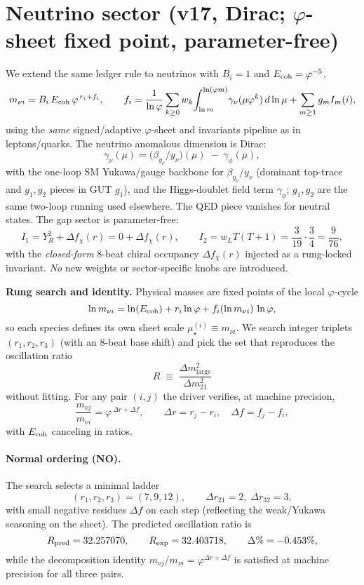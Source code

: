 \documentclass[12pt]{article}
\begin{document}
\section*{Neutrino sector (v17, Dirac; $\varphi$-sheet fixed point, parameter-free)}
We extend the same ledger rule to neutrinos with $B_i=1$ and $E_{\rm coh}=\varphi^{-5}$,
\[
m_{\nu i}=B_i\,E_{\rm coh}\,\varphi^{\,r_i+f_i},\qquad f_i=\frac{1}{\ln\varphi}\sum_{k\ge0}w_k\!\int_{\ln m}^{\ln(\varphi m)}\!\gamma_{\nu}(\mu\varphi^k)\,d\ln\mu+\sum_{m\ge1}g_m I_m(i),
\]
using the \emph{same} signed/adaptive $\varphi$-sheet and invariants pipeline as in leptons/quarks. The neutrino anomalous dimension is Dirac:
\[
\gamma_\nu(\mu)=\bigl(\beta_{y_\nu}/y_\nu\bigr)(\mu)\;-\;\gamma_\phi(\mu),
\]
with the one-loop SM Yukawa/gauge backbone for $\beta_{y_\nu}/y_\nu$ (dominant top-trace and $g_1,g_2$ pieces in GUT $g_1$), and the Higgs-doublet field term $\gamma_\phi$; $g_1,g_2$ are the same two-loop running used elsewhere. The QED piece vanishes for neutral states. The gap sector is parameter-free:
\[
I_1=Y_R^2+\Delta f_\chi(r)=0+\Delta f_\chi(r),\qquad I_2=w_L T(T{+}1)=\frac{3}{19}\cdot\frac{3}{4}=\frac{9}{76},
\]
with the \emph{closed-form} 8-beat chiral occupancy $\Delta f_\chi(r)$ injected as a rung-locked invariant. \emph{No} new weights or sector-specific knobs are introduced. 
\medskip

\noindent\textbf{Rung search and identity.}
Physical masses are fixed points of the local $\varphi$-cycle
\[
\ln m_{\nu i}=\ln(E_{\rm coh})+r_i\ln\varphi + f_i(\ln m_{\nu i})\,\ln\varphi,
\]
so each species defines its own sheet scale $\mu_\star^{(i)}\equiv m_{\nu i}$. We search integer triplets $(r_1,r_2,r_3)$ (with an 8-beat base shift) and pick the set that reproduces the oscillation ratio
\[
R \;\equiv\; \frac{\Delta m^2_{\text{large}}}{\Delta m^2_{21}}
\]
without fitting. For any pair $(i,j)$ the driver verifies, at machine precision,
\[
\frac{m_{\nu j}}{m_{\nu i}}=\varphi^{\,\Delta r+\Delta f},\qquad \Delta r=r_j-r_i,\quad \Delta f=f_j-f_i,
\]
with $E_{\rm coh}$ canceling in ratios.

\paragraph{Normal ordering (NO).} The search selects a minimal ladder
\[
(r_1,r_2,r_3)=(7,9,12),\qquad \Delta r_{21}=2,\;\Delta r_{32}=3,
\]
with small negative residues $\Delta f$ on each step (reflecting the weak/Yukawa seasoning on the sheet). The predicted oscillation ratio is
\[
R_{\rm pred}=32.257070,\qquad R_{\rm exp}=32.403718,\qquad \Delta\%=-0.453\%,
\]
while the decomposition identity $m_{\nu j}/m_{\nu i}=\varphi^{\Delta r+\Delta f}$ is satisfied at machine precision for all three pairs.
\end{document}
